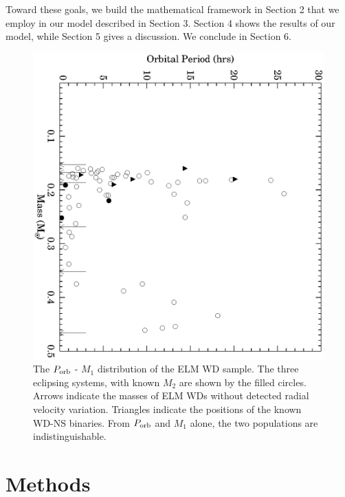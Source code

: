 \documentclass[apjl]{emulateapj}
\begin{document}
Toward these goals, we build the mathematical framework in Section 2 that we employ in our model described in Section 3. Section 4 shows the results of our model, while Section 5 gives a discussion. We conclude in Section 6.

\begin{figure}[h!]
\begin{center}
\includegraphics[angle=90,width=0.95\columnwidth]{Porb_M1.eps}
\caption{The $P_{\rm orb}$ - $M_1$ distribution of the ELM WD sample. The three eclipsing systems, with known $M_2$ are shown by the filled circles. Arrows indicate the masses of ELM WDs without detected radial velocity variation. Triangles indicate the positions of the known WD-NS binaries. From $P_{\rm orb}$ and $M_1$ alone, the two populations are indistinguishable.}
\end{center}
\end{figure}




\section{Methods}
\end{document}
